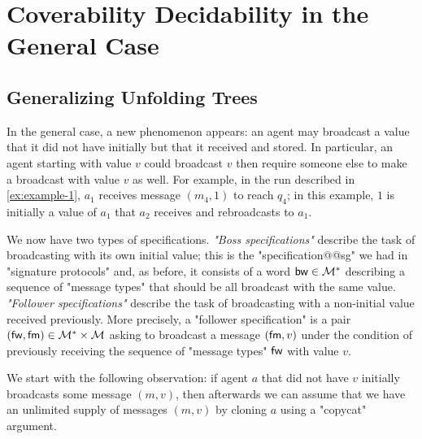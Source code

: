 \section{Coverability Decidability in the General Case}
\label{sec:cover-general-case}

\subsection{Generalizing Unfolding Trees}
\label{sec:unfolding-trees-general}
In the general case, a new phenomenon appears: an agent may broadcast a value that it did not have initially but that it received and stored. In particular, an agent starting with value $v$ could broadcast $v$ then require someone else to make a broadcast with value $v$ as well. For example, in the run described in \cref{ex:example-1}, $a_1$ receives message $(m_4, 1)$ to reach $q_4$; in this example, $1$ is initially a value of $a_1$ that $a_2$ receives and rebroadcasts to $a_1$.

 We now have two types of specifications. \emph{"Boss specifications"} describe the task of broadcasting with its own initial value; this is the "specification@@sg" we had in "signature protocols" and, as before, it consists of a word $\mathsf{bw} \in \mathcal{M}^\ast$ describing a sequence of "message types" that should be all broadcast with the same value. \emph{"Follower specifications"} describe the task of broadcasting with a non-initial value received previously. More precisely, a "follower specification" is a pair $(\mathsf{fw}, \mathsf{fm}) \in \mathcal{M}^*\times \mathcal{M}$ asking to broadcast a message $(\mathsf{fm},v)$ under the condition of previously receiving the sequence of "message types" $\mathsf{fw}$ with value $v$.


We start with the following observation: if agent $a$ that did not have $v$ initially broadcasts some message $(m,v)$, then afterwards we can assume that we have an unlimited supply of messages $(m,v)$ by cloning $a$ using a "copycat" argument. 

